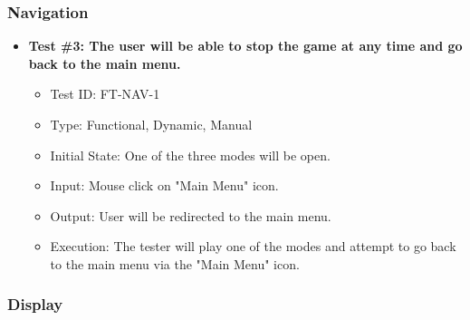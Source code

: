 \documentclass[12pt, titlepage]{article}
\begin{document}
\subsubsection{Navigation}
\begin{itemize}

\item \textbf{Test \#3: The user will be able to stop the game at any time and go back to the main menu.}
\begin{itemize}
\item Test ID: FT-NAV-1
\item Type: Functional, Dynamic, Manual 		
\item Initial State: One of the three modes will be open.					
\item Input: Mouse click on "Main Menu" icon.					
\item Output: User will be redirected to the main menu.					
\item Execution: The tester will play one of the modes and attempt to go back to the main menu via the "Main Menu" icon.
\end{itemize}

\end{itemize}

\subsubsection{Display}
\end{document}
